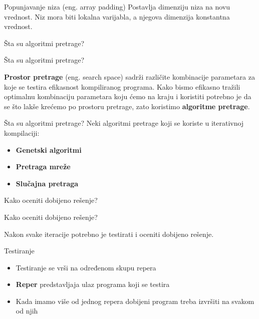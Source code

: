 \documentclass[10pt]{beamer}
\begin{document}
\begin{frame}[fragile]{Popunjavanje niza (eng. array padding)}
Postavlja dimenziju niza na novu vrednost. Niz mora biti lokalna varijabla, a njegova dimenzija konstantna vrednost.
\end{frame}

\begin{frame}[standout]
  Šta su algoritmi pretrage?
\end{frame}
\begin{frame}[fragile]{Šta su algoritmi pretrage?}

\textbf{Prostor pretrage} (eng. search space) sadrži različite kombinacije parametara za koje se testira efikasnost kompiliranog 
programa. Kako bismo efikasno tražili optimalnu kombinaciju parametara koju ćemo na kraju i koristiti potrebno je da se što 
lakše krećemo po prostoru pretrage, zato koristimo \textbf{algoritme pretrage}.
\end{frame}

\begin{frame}[fragile]{Šta su algoritmi pretrage?}
Neki algoritmi pretrage koji se koriste u iterativnoj kompilaciji:
\begin{itemize}[<+- | alert@+>]
    \item \textbf{Genetski algoritmi}
    \item \textbf{Pretraga mreže}
    \item \textbf{Slučajna pretraga}

  \end{itemize}
\end{frame}

\begin{frame}[standout]
  Kako oceniti dobijeno rešenje?
\end{frame}

\begin{frame}{Kako oceniti dobijeno rešenje?}
  
  Nakon svake iteracije potrebno je testirati i oceniti dobijeno rešenje.

\end{frame}

\begin{frame}{Testiranje}

  \begin{itemize}[<+- | alert@+>]
    \item Testiranje se vrši na određenom skupu repera
    \item \textbf{Reper} predstavljaja ulaz programa koji se testira
    \item Kada imamo više od jednog repera dobijeni program treba izvršiti na svakom od njih
  \end{itemize}

\end{frame}
\end{document}
